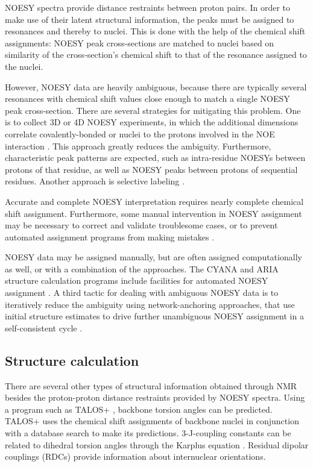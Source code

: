 NOESY spectra provide distance restraints between proton pairs.  In order to
make use of their latent structural information, the peaks must be assigned
to resonances and thereby to nuclei.  This is done with the help of the 
chemical shift assignments: NOESY peak cross-sections are matched to nuclei
based on similarity of the cross-section's chemical shift to that of the
resonance assigned to the nuclei.

However, NOESY data are heavily ambiguous, because there are typically several
resonances with chemical shift values close enough to match a single NOESY
peak cross-section.  There are several strategies for mitigating this problem.
One is to collect 3D or 4D NOESY experiments, in which the additional dimensions
correlate covalently-bonded \nmrisoc{} or \nmrison{} nuclei to the protons 
involved in the NOE interaction \cite{majumdar1993improved}.  
This approach greatly reduces the ambiguity.  Furthermore,
characteristic peak patterns are expected, such as intra-residue NOESYs between
protons of that residue, as well as NOESY peaks between protons of sequential
residues.  Another approach is selective labeling \cite{takeda2007automated}.

Accurate and complete NOESY interpretation requires nearly complete chemical
shift assignment.  Furthermore, some manual intervention in NOESY assignment
may be necessary to correct and validate troublesome cases, or to prevent
automated assignment programs from making mistakes 
\cite{guntert2009automated, guerry2011automated}.

NOESY data may be assigned manually, but are often assigned computationally
as well, or with a combination of the approaches.  The CYANA and ARIA structure 
calculation programs include facilities for automated NOESY assignment
\cite{cyana2004, aria2003}.  
A third tactic for dealing with ambiguous NOESY data is to iteratively reduce the
ambiguity using network-anchoring approaches, that use initial structure 
estimates to drive further unambiguous NOESY assignment in a self-consistent
cycle \cite{cyana2004, aria2003}.

\subsection*{Structure calculation}

There are several other types of structural information obtained through NMR
besides the proton-proton distance restraints provided by NOESY spectra.
Using a program such as TALOS+ \cite{talos+}, backbone torsion angles can be 
predicted.  TALOS+
uses the chemical shift assignments of backbone nuclei in conjunction with a
database search to make its predictions.  3-J-coupling constants can be 
related to dihedral torsion angles through the Karplus equation
\cite{karplus1959contact, karplus1963vicinal}.  Residual dipolar couplings
(RDCs) provide information about internuclear orientations.

